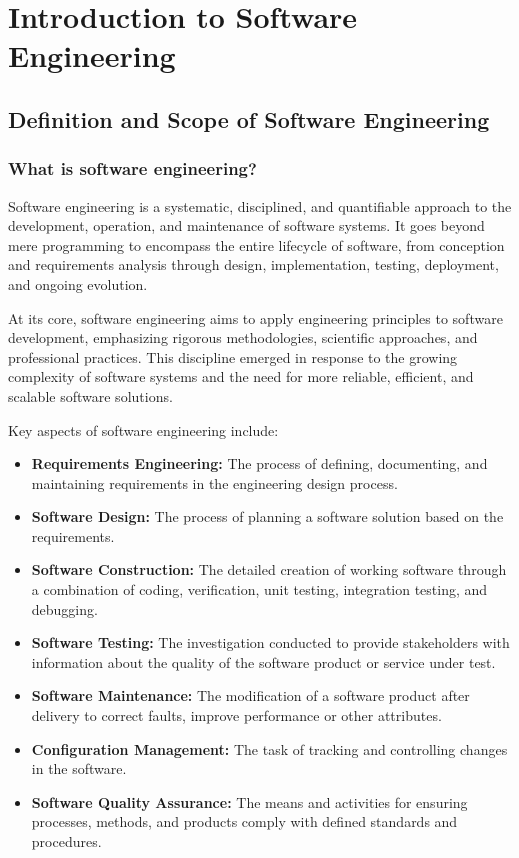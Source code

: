 \chapter{Introduction to Software Engineering}

\begin{refsection}
\section{Definition and Scope of Software Engineering}
\begin{multicols}{2}
\subsection{What is software engineering?}
{\small
Software engineering is a systematic, disciplined, and quantifiable approach to the development, operation, and maintenance of software systems. It goes beyond mere programming to encompass the entire lifecycle of software, from conception and requirements analysis through design, implementation, testing, deployment, and ongoing evolution.

At its core, software engineering aims to apply engineering principles to software development, emphasizing rigorous methodologies, scientific approaches, and professional practices. This discipline emerged in response to the growing complexity of software systems and the need for more reliable, efficient, and scalable software solutions.

Key aspects of software engineering include:

\begin{itemize}
    \item \textbf{Requirements Engineering:} The process of defining, documenting, and maintaining requirements in the engineering design process.
    \item \textbf{Software Design:} The process of planning a software solution based on the requirements.
    \item \textbf{Software Construction:} The detailed creation of working software through a combination of coding, verification, unit testing, integration testing, and debugging.
    \item \textbf{Software Testing:} The investigation conducted to provide stakeholders with information about the quality of the software product or service under test.
    \item \textbf{Software Maintenance:} The modification of a software product after delivery to correct faults, improve performance or other attributes.
    \item \textbf{Configuration Management:} The task of tracking and controlling changes in the software.
    \item \textbf{Software Quality Assurance:} The means and activities for ensuring processes, methods, and products comply with defined standards and procedures.
\end{itemize}

}
\end{multicols}
\end{refsection}
